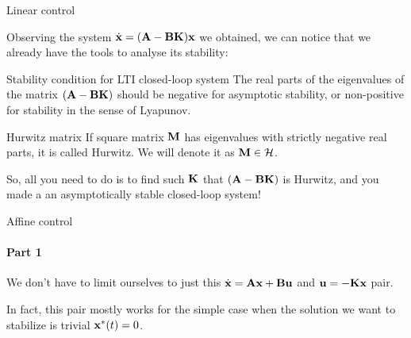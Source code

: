 \documentclass{beamer}
\begin{document}
\begin{frame}{Linear control}
\begin{flushleft}

Observing the system $\dot{\mathbf{x}} = (\mathbf{A} - \mathbf{B}\mathbf{K})\mathbf{x}$ we obtained, we can notice that we already have the tools to analyse its stability:

\begin{block}{Stability condition for LTI closed-loop system}
The real parts of the eigenvalues of the matrix $(\mathbf{A} - \mathbf{B}\mathbf{K})$ should be negative for asymptotic stability, or non-positive for stability in the sense of Lyapunov.
\end{block}

\begin{block}{Hurwitz matrix}
	If square matrix $\mathbf{M}$ has eigenvalues with strictly negative real parts, it is called Hurwitz. We will denote it as $\mathbf{M} \in \mathcal{H}$.
\end{block}


So, all you need to do is to find such $\mathbf{K}$ that $(\mathbf{A} - \mathbf{B}\mathbf{K})$ is Hurwitz, and you made a an asymptotically stable closed-loop system!

\end{flushleft}
\end{frame}




\begin{frame}{Affine control}
\framesubtitle{Part 1}
\begin{flushleft}

We don't have to limit ourselves to just this $\dot{\mathbf{x}} = \mathbf{A}\mathbf{x} + \mathbf{B}\mathbf{u}$ and $\mathbf{u} = -\mathbf{K}\mathbf{x}$ pair. 

\bigskip

In fact, this pair mostly works for the simple case when the solution we want to stabilize is trivial $\mathbf{x}^*(t) = 0$.


\end{flushleft}
\end{frame}
\end{document}
